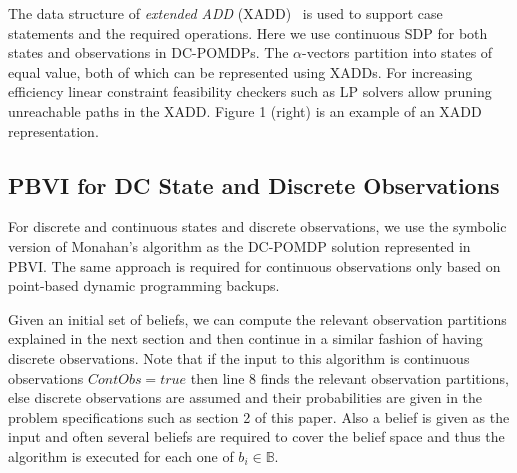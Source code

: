 \documentclass{article} %
\begin{document}
The data structure of \emph{extended ADD} (XADD)~\cite{sanner_uai11} is used to support
case statements and the required operations.  Here we use continuous SDP for both states and observations in DC-POMDPs. The $\alpha$-vectors partition into states of equal value, both of which can be represented using XADDs. For increasing efficiency linear constraint feasibility checkers such as LP solvers allow pruning unreachable paths in the XADD. Figure 1 (right) is an example of an XADD representation. 

\subsection{PBVI for DC State and Discrete Observations} 

For discrete and continuous states and discrete observations, we use the symbolic version of Monahan's algorithm as the DC-POMDP solution represented in \textsc{PBVI}. The same approach is required for continuous observations only based on point-based dynamic programming backups.

Given an initial set of beliefs, we can compute the relevant observation partitions explained in the next section and then continue in a similar fashion of having discrete observations. %
Note that if the input to this algorithm is continuous observations $ContObs=true$ then line 8 finds the relevant observation partitions, else discrete observations are assumed and their probabilities are given in the problem specifications such as section 2 of this paper. Also a belief is given as the input and often several beliefs are required to cover the belief space and thus the algorithm is executed for each one of $b_i \in \mathbb{B}$.
\end{document}
